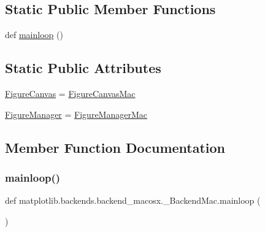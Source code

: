 \subsection*{Static Public Member Functions}
\begin{DoxyCompactItemize}
\item 
def \hyperlink{classmatplotlib_1_1backends_1_1backend__macosx_1_1__BackendMac_a897eb654d97f7abf82665ccb274b9b6b}{mainloop} ()
\end{DoxyCompactItemize}
\subsection*{Static Public Attributes}
\begin{DoxyCompactItemize}
\item 
\hyperlink{classmatplotlib_1_1backends_1_1backend__macosx_1_1__BackendMac_a9d6c2e62cd6f5e2e5ba172bbb1864d22}{Figure\+Canvas} = \hyperlink{classmatplotlib_1_1backends_1_1backend__macosx_1_1FigureCanvasMac}{Figure\+Canvas\+Mac}
\item 
\hyperlink{classmatplotlib_1_1backends_1_1backend__macosx_1_1__BackendMac_a38357694256a156f6c5bb5efca0b5a8b}{Figure\+Manager} = \hyperlink{classmatplotlib_1_1backends_1_1backend__macosx_1_1FigureManagerMac}{Figure\+Manager\+Mac}
\end{DoxyCompactItemize}


\subsection{Member Function Documentation}
\mbox{\label{classmatplotlib_1_1backends_1_1backend__macosx_1_1__BackendMac_a897eb654d97f7abf82665ccb274b9b6b}} 
\subsubsection{\texorpdfstring{mainloop()}{mainloop()}}
{\footnotesize\ttfamily def matplotlib.\+backends.\+backend\+\_\+macosx.\+\_\+\+Backend\+Mac.\+mainloop (\begin{DoxyParamCaption}{ }\end{DoxyParamCaption})\hspace{0.3cm}{\ttfamily [static]}}



